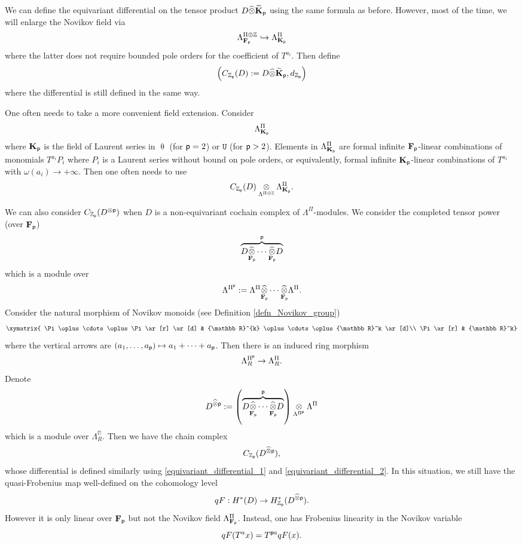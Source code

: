 \documentclass[reqno, 10pt]{amsart}
\numberwithin{equation}{section}
\numberwithin{equation}{section}
\theoremstyle{definition}
\theoremstyle{remark}
\newcommand{\beqn}{\begin{equation*}}
\newcommand{\eeqn}{\end{equation*}}
\newcommand{\mb}{\mathbb}
\newcommand{\p}{{\sf p}}
\newcommand{\fp}{{\bf F}_{\sf p}}
\newcommand{\kp}{{\bf K}_{\sf p}}
\newcommand{\tkp}{\wt{\bf K}_{\sf p}}
\newcommand{\zp}{{{\mb Z}_{\sf p}}}
\newcommand{\tu}{\mathtt{U}}
\newcommand{\wt}{\widetilde}
\begin{document}
We can define the equivariant differential on the tensor product $D \widehat{\otimes} \tkp$ using the same formula as before. However, most of the time, we will enlarge the Novikov field via
\beqn
\Lambda_{\fp}^{\Pi \oplus {\mb Z}} \hookrightarrow \Lambda_{\kp}^{\Pi}
\eeqn
where the latter does not require bounded pole orders for the coefficient of $T^{a_i}$. Then define 
\beqn
\left( C_{\zp} (D):= D  \widehat{\otimes} \tkp, d_{\zp} \right)
\eeqn
where the differential is still defined in the same way. 

One often needs to take a more convenient field extension. Consider 
\beqn
\Lambda_{\kp}^\Pi
\eeqn
where $\kp$ is the field of Laurent series in $\uptheta$ (for $\p=2$) or $\tu$ (for $\p > 2$). Elements in $\Lambda_{\kp}^\Pi$ are formal infinite $\fp$-linear combinations of monomials $T^{a_i} P_i$ where $P_i$ is a Laurent series without bound on pole orders, or equivalently, formal infinite $\kp$-linear combinations of $T^{a_i}$ with $\omega(a_i) \to +\infty$. Then one often needs to use
\beqn
C_{\zp} (D) \underset{\Lambda^{\Pi \oplus {\mb Z}}}{\otimes} \Lambda_{\kp}^\Pi.
\eeqn

We can also consider $C_{\zp}(D^{\otimes \p})$ when $D$ is a non-equivariant cochain complex of $\Lambda^\Pi$-modules. We consider the completed tensor power (over $\fp$)
\beqn
\overbrace{ D  \widehat{\underset{\fp}{\otimes}} \cdots \widehat{\underset{\fp}{\otimes}} D }^{\p}
\eeqn
which is a module over 
\beqn
\Lambda^{\Pi^\p}:= \Lambda^{\Pi} \widehat{\underset{\fp}{\otimes}} \cdots \widehat{\underset{\fp}{\otimes}} \Lambda^{\Pi}.
\eeqn
Consider the natural morphism of Novikov monoids (see Definition \ref{defn_Novikov_group})
\beqn
\xymatrix{ \Pi \oplus \cdots \oplus \Pi \ar[r] \ar[d] & {\mb R}^{k} \oplus \cdots \oplus {\mb R}^k \ar[d]\\
    \Pi \ar[r] & {\mb R}^k}
\eeqn
where the vertical arrows are $(a_1, \ldots, a_\p) \mapsto a_1 + \cdots + a_\p$. Then there is an induced ring morphism
\beqn
\Lambda_R^{\Pi^{\p}} \to \Lambda_R^{\Pi}.
\eeqn
Denote
\beqn
D^{\widehat{\otimes} \p}:= \left( \overbrace{ D \widehat{\underset{\fp}{\otimes}} \cdots \widehat{\underset{\fp}{\otimes}} D }^{\p} \right) \underset{ \Lambda^{\Pi^{\p}}}{\otimes} \Lambda^{\Pi}
\eeqn
which is a module over $\Lambda_R^{\mb\Pi}$. Then we have the chain complex
\beqn
C_{\zp} ( D^{\widehat{\otimes} \p} ),
\eeqn
whose differential is defined similarly using \eqref{equivariant_differential_1} and \eqref{equivariant_differential_2}. In this situation, we still have the quasi-Frobenius map well-defined on the cohomology level
\beqn
qF: H^*(D) \to H_{\zp}^*( D^{\widehat{\otimes} \p}).
\eeqn
However it is only linear over $\fp$ but not the Novikov field $\Lambda_{\fp}^\Pi$. Instead, one has Frobenius linearity in the Novikov variable
\beqn
qF( T^{a} x ) = T^{\p a} qF(x). 
\eeqn
\end{document}
